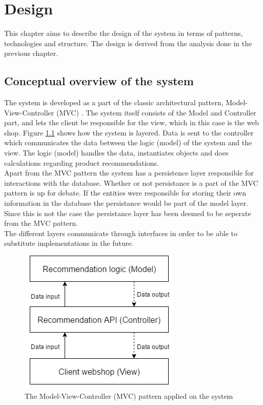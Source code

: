 
\chapter{Design} %

\label{Design} %

This chapter aims to describe the design of the system in terms of patterns, technologies and structure. The design is derived from the analysis done in the previous chapter.

\section{Conceptual overview of the system}
The system is developed as a part of the classic architectural pattern, Model-View-Controller (MVC) \cite{PatternsOfEnterprise}. The system itself consists of the Model and Controller part, and lets the client be responsible for the view, which in this case is the web shop. Figure \ref{fig:MVC} shows how the system is layered. Data is sent to the controller which communicates the data between the logic (model) of the system and the view. The logic (model) handles the data, instantiates objects and does calculations regarding product recommendations. \\
Apart from the MVC pattern the system has a persistence layer responsible for interactions with the database. Whether or not persistance is a part of the MVC pattern is up for debate. If the entities were responsible for storing their own information in the database the persistance would be part of the model layer. Since this is not the case the persistance layer has been deemed to be seperate from the MVC pattern. \\
The different layers communicate through interfaces in order to be able to substitute implementations in the future. 

\begin{figure}[H]
	\centering
	\includegraphics[width=.4\linewidth]{Figures/MVC.png}
	\caption{The Model-View-Controller (MVC) pattern applied on the system}
	\label{fig:MVC}
\end{figure}

